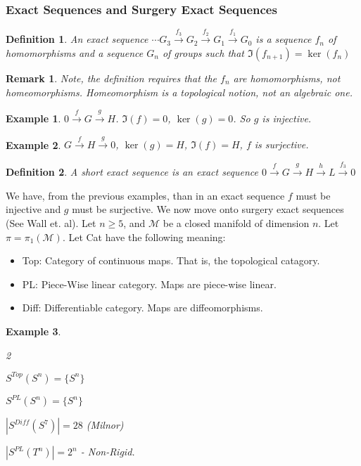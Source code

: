 \documentclass{article}
\theoremstyle{mystyle}
\newtheorem{definition}{Definition}[section]
\newtheorem{example}{Example}[section]
\newtheorem{remark}{Remark}[section]
\begin{document}
\subsubsection{Exact Sequences and Surgery Exact Sequences}
\begin{definition}
An exact sequence $\cdots G_{3}\overset{f_{3}}{\rightarrow}G_{2}\overset{f_{2}}{\rightarrow}G_{1}\overset{f_{1}}{\rightarrow}G_{0}$ is a sequence $f_{n}$ of homomorphisms and a sequence $G_{n}$ of groups such that $\Im(f_{n+1}) = \ker(f_{n})$
\end{definition}
\begin{remark}
Note, the definition requires that the $f_{n}$ are \textit{homomorphisms}, not homeomorphisms. Homeomorphism is a topological notion, not an algebraic one.
\end{remark}
\begin{example}
$0\overset{f}{\rightarrow}G\overset{g}{\rightarrow}H$. $\Im(f) = 0$, $\ker(g) = 0$. So $g$ is injective.
\end{example}
\begin{example}
$G\overset{f}{\rightarrow}H\overset{g}{\rightarrow}0$, $\ker(g) = H$, $\Im(f) = H$, $f$ is surjective.
\end{example}
\begin{definition}
A short exact sequence is an exact sequence $0\overset{f}{\rightarrow}G\overset{g}{\rightarrow}H\overset{h}{\rightarrow}L\overset{f_{3}}{\rightarrow}0$
\end{definition}
We have, from the previous examples, than in an exact sequence $f$ must be injective and $g$ must be surjective. We now move onto surgery exact sequences (See Wall et. al). Let $n\geq 5$, and $\mathcal{M}$ be a closed manifold of dimension $n$. Let $\pi = \pi_{1}(\mathcal{M})$. Let Cat have the following meaning:
\begin{itemize}
    \item Top: Category of continuous maps. That is, the topological catagory.
    \item PL: Piece-Wise linear category. Maps are piece-wise linear.
    \item Diff: Differentiable category. Maps are diffeomorphisms.
\end{itemize}
\begin{example}
\
\begin{enumerate}
\end{enumerate}
\end{example}
\end{document}
